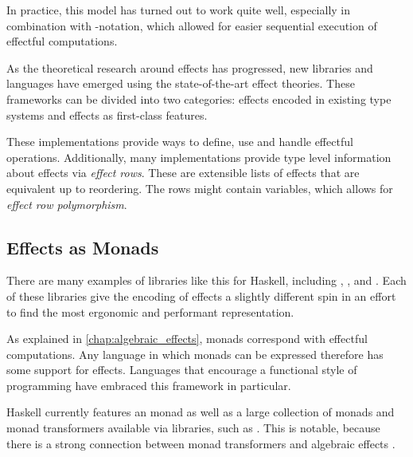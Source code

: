 In practice, this model has turned out to work quite well, especially in combination with -notation, which allowed for easier sequential execution of effectful computations.


As the theoretical research around effects has progressed, new libraries and languages have emerged using the state-of-the-art effect theories. These frameworks can be divided into two categories: effects encoded in existing type systems and effects as first-class features.

These implementations provide ways to define, use and handle effectful operations. Additionally, many implementations provide type level information about effects via \emph{effect rows}. These are extensible lists of effects that are equivalent up to reordering. The rows might contain variables, which allows for \emph{effect row polymorphism}.

\subsection{Effects as Monads}

There are many examples of libraries like this for Haskell, including , ,  and . Each of these libraries give the encoding of effects a slightly different spin in an effort to find the most ergonomic and performant representation.

As explained in \cref{chap:algebraic_effects}, monads correspond with effectful computations. Any language in which monads can be expressed therefore has some support for effects. Languages that encourage a functional style of programming have embraced this framework in particular.

Haskell currently features an  monad \autocite{peyton_jones_imperative_1993} as well as a large collection of monads and monad transformers available via libraries, such as . This is notable, because there is a strong connection between monad transformers and algebraic effects \autocite{schrijvers_monad_2019}.


